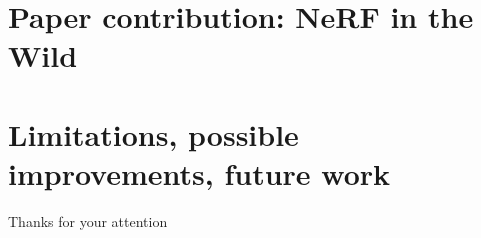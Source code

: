 \documentclass[aspectratio=1610]{beamer}
\begin{document}
\section{Paper contribution: NeRF in the Wild}
\begin{frame}{}

    

\end{frame}

\section{Limitations, possible improvements, future work}
\begin{frame}
    \begin{center}
        Thanks for your attention
    \end{center}
\end{frame}
\end{document}
